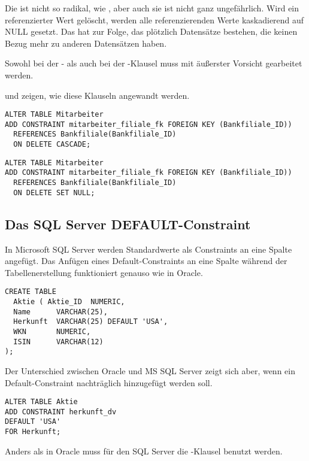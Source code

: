         Die  ist nicht so radikal, wie , aber auch sie ist nicht ganz ungefährlich. Wird ein referenzierter Wert gelöscht, werden alle referenzierenden Werte kaskadierend auf NULL gesetzt. Das hat zur Folge, das plötzlich Datensätze bestehen, die keinen Bezug mehr zu anderen Datensätzen haben.

        \begin{merke}
          Sowohl bei der - als auch bei der -Klausel muss mit äußerster Vorsicht gearbeitet werden.
        \end{merke}
         und  zeigen, wie diese Klauseln angewandt werden.
        \begin{lstlisting}[language=oracle_sql,caption={Ein Foreign Key-Constraint mit ON DELETE CASCADE-Klausel},label=sql09_17]
ALTER TABLE Mitarbeiter
ADD CONSTRAINT mitarbeiter_filiale_fk FOREIGN KEY (Bankfiliale_ID))
  REFERENCES Bankfiliale(Bankfiliale_ID)
  ON DELETE CASCADE;
        \end{lstlisting}

        \begin{lstlisting}[language=oracle_sql,caption={Ein Foreign Key-Constraint mit ON DELETE SET NULL-Klausel},label=sql09_18]
ALTER TABLE Mitarbeiter
ADD CONSTRAINT mitarbeiter_filiale_fk FOREIGN KEY (Bankfiliale_ID))
  REFERENCES Bankfiliale(Bankfiliale_ID)
  ON DELETE SET NULL;
        \end{lstlisting}
      \subsection{Das SQL Server DEFAULT-Constraint}
        In Microsoft SQL Server werden Standardwerte als Constraints an eine
        Spalte angefügt. Das Anfügen eines Default-Constraints an eine Spalte
        während der Tabellenerstellung funktioniert genauso wie in Oracle.
          \begin{lstlisting}[language=ms_sql,caption={Erstellen
          einer Tabelle mit einem Standardwert},label=sql09_18a]
CREATE TABLE
  Aktie ( Aktie_ID  NUMERIC,
  Name      VARCHAR(25),
  Herkunft  VARCHAR(25) DEFAULT 'USA',
  WKN       NUMERIC,
  ISIN      VARCHAR(12)
);
          \end{lstlisting}
          Der Unterschied zwischen Oracle und MS SQL Server zeigt sich aber, wenn ein Default-Constraint nachträglich hinzugefügt werden soll.
          \begin{lstlisting}[language=ms_sql,caption={Tabellenspalte mit
          Standardwert hinzufügen in SQL Server},label=sql09_18b] 
ALTER TABLE Aktie
ADD CONSTRAINT herkunft_dv
DEFAULT 'USA'
FOR Herkunft;
          \end{lstlisting}
          Anders als in Oracle muss für den SQL Server die -Klausel benutzt werden.
